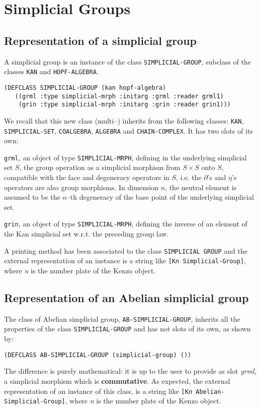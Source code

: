 \chapter {Simplicial Groups}

\section {Representation of a  simplicial group}

A simplicial group is  an instance
of the class {\tt SIMPLICIAL-GROUP}, subclass of the classes {\tt KAN} and {\tt HOPF-ALGEBRA}.
{\footnotesize\begin{verbatim}
(DEFCLASS SIMPLICIAL-GROUP (kan hopf-algebra)
   ((grml :type simplicial-mrph :initarg :grml :reader grml1)
    (grin :type simplicial-mrph :initarg :grin :reader grin1)))
\end{verbatim}}
We recall that this new class (multi--) inherits  from the following classes:
{\tt KAN}, {\tt SIMPLICIAL-SET}, {\tt COALGEBRA},  {\tt ALGEBRA} and {\tt CHAIN-COMPLEX}.
It has two slots of its own:
\begin{description}
\item {\tt grml}, an object of type {\tt SIMPLICIAL-MRPH}, defining in the underlying simplicial set $S$,
the group operation  as a simplicial morphism from $S \times S$ onto $S$,
compatible with the face and degeneracy operators in $S$, i.e. the $\partial$'s and $\eta$'s operators are
also group morphisms. In dimension $n$, the neutral element is assumed to be the $n$--th degeneracy of
the base point of the underlying simplicial set.
\item {\tt grin}, an object of type {\tt SIMPLICIAL-MRPH}, defining the inverse of an element of the
Kan simplicial set w.r.t. the preceding group law.
\end{description}
A printing method has been associated to the class {\tt SIMPLICIAL GROUP} and the external representation
of  an instance is a string like {\tt [K{\em n} Simplicial-Group]}, where {\em n} is the number plate of
the Kenzo object.

\section {Representation of an Abelian  simplicial group}

The class of Abelian simplicial group, {\tt AB-SIMPLICIAL-GROUP},
inherits  all the properties of the class {\tt SIMPLICIAL-GROUP} and has not slots of its own, as shown by:
{\footnotesize\begin{verbatim}
(DEFCLASS AB-SIMPLICIAL-GROUP (simplicial-group) ())
\end{verbatim}}
The difference is purely mathematical: it is up to the user to provide as slot
{\em grml}, a simplicial morphism which is {\bf commutative}. As expected,
the external representation of  an instance of this class, is a string like
{\tt [K{\em n} Abelian-Simplicial-Group]}, where {\em n} is the number plate of
the Kenzo object.


